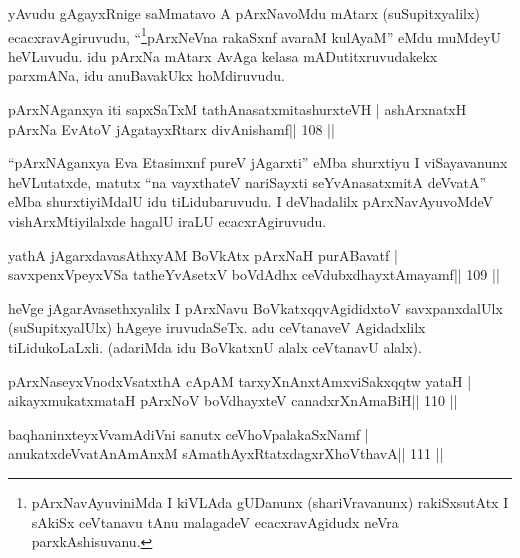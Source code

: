 \begin{artha}
yAvudu gAgayxRnige saMmatavo A pArxNavoMdu mAtarx (suSupitxyalilx)  ecacxravAgiruvudu, ``\footnote{pArxNavAyuviniMda I kiVLAda gUDanunx  (shariVravanunx) rakiSxsutAtx I sAkiSx ceVtanavu tAnu malagadeV ecacxravAgidudx neVra parxkAshisuvanu.}pArxNeVna rakaSxnf avaraM kulAyaM'' eMdu muMdeyU heVLuvudu. idu pArxNa mAtarx AvAga kelasa mADutitxruvudakekx parxmANa, idu anuBavakUkx hoMdiruvudu.
\end{artha}


\begin{shl}
pArxNAganxya iti sapxSaTxM tathA\s nasatxmitashurxteVH |
ashArxnatxH pArxNa EvAtoV jAgatayxRtarx divAnishamf\hfill || 108 ||
\end{shl}

\begin{artha}
``pArxNAganxya Eva Etasimxnf pureV jAgarxti'' eMba shurxtiyu I 
viSayavanunx heVLutatxde, matutx ``na vayxthateV nariSayxti seYvAnasatxmitA deVvatA'' eMba shurxtiyiMdalU idu tiLidubaruvudu. I deVhadalilx pArxNavAyuvoMdeV vishArxMtiyilalxde hagalU iraLU ecacxrAgiruvudu.
\end{artha} 

\begin{shl}
yathA jAgarxdavasAthxyAM BoVkAtx pArxNaH purA\s Bavatf |
savxpenxV\s peyxVSa tatheYvA\s\s setxV boVdAdhx ceVdubxdhayxtAmayamf\hfill || 109 ||
\end{shl}

\begin{artha}
heVge jAgarAvasethxyalilx I pArxNavu BoVkatxqqvAgididxtoV  savxpanxdalUlx (suSupitxyalUlx) hAgeye iruvudaSeTx. adu ceVtanaveV  Agidadxlilx tiLidukoLaLxli. (adariMda idu BoVkatxnU alalx ceVtanavU alalx).
\end{artha}


\begin{shl}
pArxNaseyxVnodxVsatxthA cApAM tarxyXnAnxtAmxviSakxqqtw yataH |
aikayxmukatxmataH pArxNoV boVdhayxteV canadxrXnAmaBiH\hfill || 110 ||
\end{shl}

\begin{shl}
baqhaninxteyxVvamAdiVni sanutx ceVhoVpalakaSxNamf |
anukatxdeVvatAnAmAnxM sAmathAyxRtatxdagxrXhoV\s thavA\hfill || 111 ||
\end{shl}

